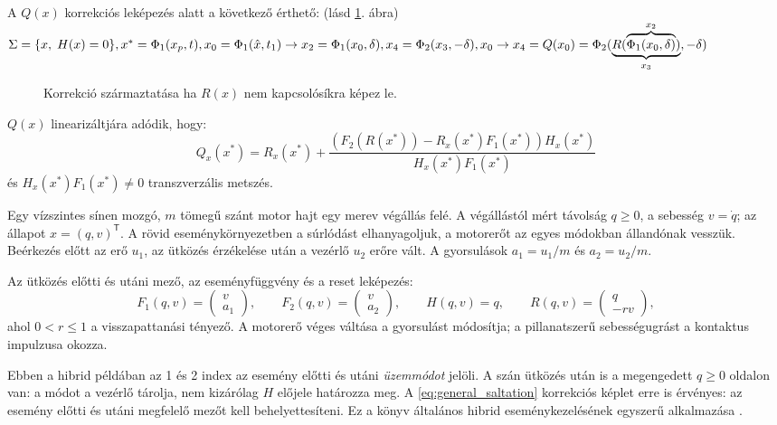  A $Q(x)$ korrekciós leképezés alatt a következő érthető: (lásd \ref{fig:502}. ábra)
\noindent
 $\Sigma = \lbrace x,\; H(x)=0 \rbrace,\\
 x^*=\Phi_1(x_p,t),\\
 x_0=\Phi_1{(\hat{x},t_1)} \rightarrow x_2=\Phi_1(x_0,\delta),\\
 x_4=\Phi_2(x_3,-\delta),\\
 x_0 \rightarrow x_4=Q(x_0)=\Phi_2(\underbrace{R(\overbrace{\Phi_1(x_0,\delta)}^{x_2})}_{x_3},-\delta)$

\begin{figure}[ht]
\centering

\caption{Korrekció származtatása ha $R(x)$ nem kapcsolósíkra képez le.}\label{fig:502}
\end{figure}

 $Q(x)$ linearizáltjára adódik, hogy:
 \begin{equation}
  Q_x(x^*)=R_x(x^*)+\frac{(F_2(R(x^*))-R_x(x^*)F_1(x^*))H_x(x^*)}{H_x(x^*)F_1(x^*)}\label{eq:general_saltation}
 \end{equation}
  és $H_x(x^*)F_1(x^*)\neq 0$ transzverzális metszés.

Egy vízszintes sínen mozgó, $m$ tömegű szánt motor hajt egy merev végállás felé. A végállástól mért távolság $q\geq0$, a sebesség $v=\dot q$; az állapot $x=(q,v)^{\mathsf T}$. A rövid eseménykörnyezetben a súrlódást elhanyagoljuk, a motorerőt az egyes módokban állandónak vesszük. Beérkezés előtt az erő $u_1$, az ütközés érzékelése után a vezérlő $u_2$ erőre vált. A gyorsulások $a_1=u_1/m$ és $a_2=u_2/m$.

Az ütközés előtti és utáni mező, az eseményfüggvény és a reset leképezés:
\[
F_1(q,v)=\begin{pmatrix}v\\a_1\end{pmatrix},\qquad
F_2(q,v)=\begin{pmatrix}v\\a_2\end{pmatrix},\qquad
H(q,v)=q,\qquad R(q,v)=\begin{pmatrix}q\\-rv\end{pmatrix},
\]
ahol $0<r\leq1$ a visszapattanási tényező. A motorerő véges váltása a gyorsulást módosítja; a pillanatszerű sebességugrást a kontaktus impulzusa okozza.

Ebben a hibrid példában az 1 és 2 index az esemény előtti és utáni \emph{üzemmódot} jelöli. A szán ütközés után is a megengedett $q\geq0$ oldalon van: a módot a vezérlő tárolja, nem kizárólag $H$ előjele határozza meg. A \eqref{eq:general_saltation} korrekciós képlet erre is érvényes: az esemény előtti és utáni megfelelő mezőt kell behelyettesíteni. Ez a könyv általános hibrid eseménykezelésének egyszerű alkalmazása \cite[2.5.2. szakasz]{dib}.


